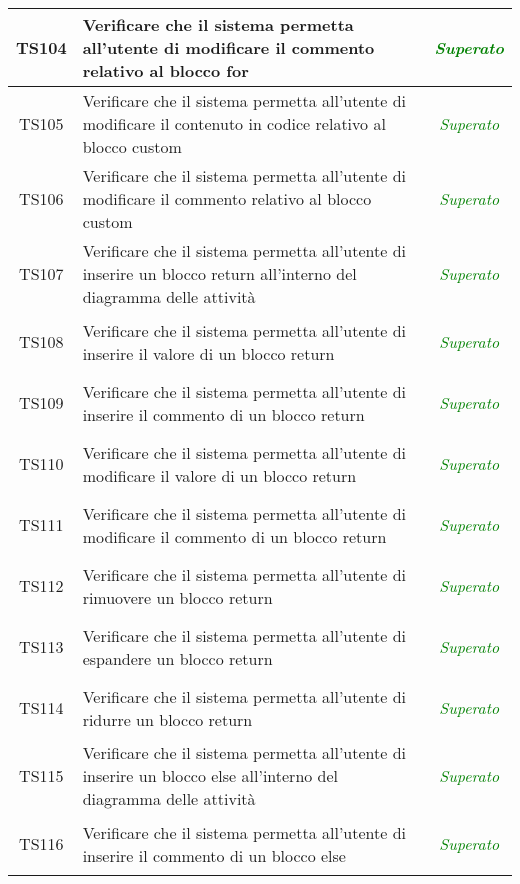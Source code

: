 \begin{longtable}{|c|>{}m{8cm}|c|}
\hypertarget{TS4.24.4}{TS104} & Verificare che il sistema permetta all'utente di modificare il commento relativo al blocco for & \textcolor{Green}{\textit{Superato}}\\ \hline
\hypertarget{TS4.25.1}{TS105} & Verificare che il sistema permetta all'utente di modificare il contenuto in codice relativo al blocco custom & \textcolor{Green}{\textit{Superato}}\\ \hline
\hypertarget{TS4.25.2}{TS106} & Verificare che il sistema permetta all'utente di modificare il commento relativo al blocco custom & \textcolor{Green}{\textit{Superato}}\\ \hline
\hypertarget{TS4.26}{TS107} & Verificare che il sistema permetta all'utente di inserire un blocco return all'interno del diagramma delle attività & \textcolor{Green}{\textit{Superato}}\\ \hline
\hypertarget{TS4.26.1}{TS108} & Verificare che il sistema permetta all'utente di inserire il valore di un blocco return & \textcolor{Green}{\textit{Superato}}\\ \hline
\hypertarget{TS4.26.2}{TS109} & Verificare che il sistema permetta all'utente di inserire il commento di un blocco return & \textcolor{Green}{\textit{Superato}}\\ \hline
\hypertarget{TS4.27.1}{TS110} & Verificare che il sistema permetta all'utente di modificare il valore di un blocco return & \textcolor{Green}{\textit{Superato}}\\ \hline
\hypertarget{TS4.27.2}{TS111} & Verificare che il sistema permetta all'utente di modificare il commento di un blocco return & \textcolor{Green}{\textit{Superato}}\\ \hline
\hypertarget{TS4.28}{TS112} & Verificare che il sistema permetta all'utente di rimuovere un blocco return & \textcolor{Green}{\textit{Superato}}\\ \hline
\hypertarget{TS4.29}{TS113} & Verificare che il sistema permetta all'utente di espandere un blocco return & \textcolor{Green}{\textit{Superato}}\\ \hline
\hypertarget{TS4.30}{TS114} & Verificare che il sistema permetta all'utente di ridurre un blocco return & \textcolor{Green}{\textit{Superato}}\\ \hline
\hypertarget{TS4.31}{TS115} & Verificare che il sistema permetta all'utente di inserire un blocco else all'interno del diagramma delle attività & \textcolor{Green}{\textit{Superato}}\\ \hline
\hypertarget{TS4.32.1}{TS116} & Verificare che il sistema permetta all'utente di inserire il commento di un blocco else & \textcolor{Green}{\textit{Superato}}\\ \hline

\end{longtable}
